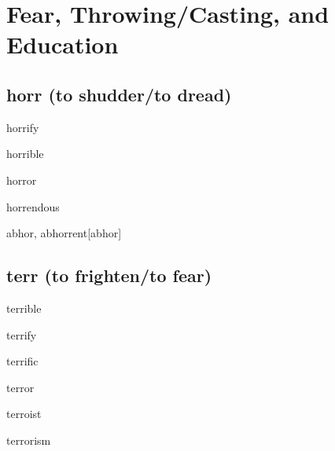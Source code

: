 \chapter{Fear, Throwing/Casting, and Education}

\section{horr (to shudder/to dread)}

\begin{RefWord}{horrify}
\end{RefWord}

\begin{RefWord}{horrible}
\end{RefWord}

\begin{RefWord}{horror}
\end{RefWord}

\begin{RefWord}{horrendous}
\end{RefWord}

\begin{RefWord}{abhor, abhorrent}[abhor]
\end{RefWord}







\section{terr (to frighten/to fear)}

\begin{RefWord}{terrible}
\end{RefWord}

\begin{RefWord}{terrify}
\end{RefWord}

\begin{RefWord}{terrific}
\end{RefWord}

\begin{RefWord}{terror}
\end{RefWord}

\begin{RefWord}{terroist}
\end{RefWord}

\begin{RefWord}{terrorism}
\end{RefWord}

